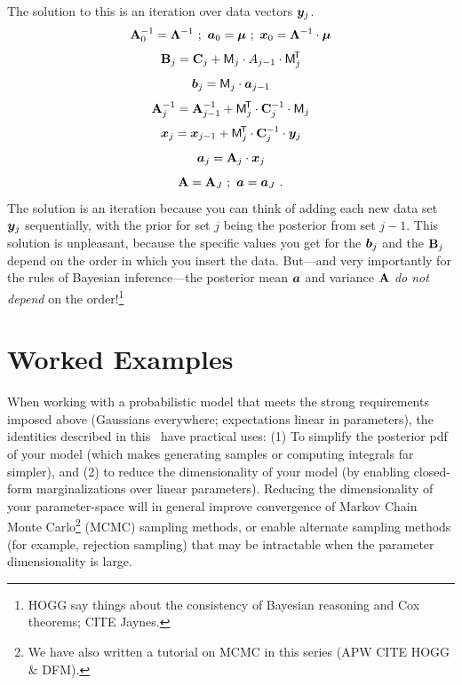 The solution to this is an iteration over data vectors $\boldsymbol{y}_j$.
\begin{equation}
  \mathbf{A}_0^{-1} = \mathbf{\Lambda}^{-1} ~;~ \boldsymbol{a}_0 = \boldsymbol{\mu} ~;~ \boldsymbol{x}_0 = \mathbf{\Lambda}^{-1}\cdot\boldsymbol{\mu}
\end{equation}
\begin{equation}
  \mathbf{B}_j = \mathbf{C}_j + \mathsf{M}_j \cdot A_{j-1} \cdot \mathsf{M}_j^{\!\mathsf{T}\!}
\end{equation}
\begin{equation}
  \boldsymbol{b}_j = \mathsf{M}_j \cdot \boldsymbol{a}_{j-1}
\end{equation}
\begin{equation}
  \mathbf{A}_j^{-1} = \mathbf{A}_{j-1}^{-1} + \mathsf{M}_j^{\!\mathsf{T}\!} \cdot \mathbf{C}_j^{-1} \cdot \mathsf{M}_j
\end{equation}
\begin{equation}
  \boldsymbol{x}_j = \boldsymbol{x}_{j-1} + \mathsf{M}_j^{\!\mathsf{T}\!} \cdot \mathbf{C}_j^{-1} \cdot \boldsymbol{y}_j
\end{equation}
\begin{equation}
  \boldsymbol{a}_j = \mathbf{A}_j \cdot \boldsymbol{x}_j
\end{equation}
\begin{equation}
  \mathbf{A} = \mathbf{A}_J ~;~ \boldsymbol{a} = \boldsymbol{a}_J
  ~.
\end{equation}
The solution is an iteration because you can think of adding each new data
set $\boldsymbol{y}_j$ sequentially, with the prior for set $j$ being the posterior from
set $j-1$.
This solution is unpleasant, because the specific values you get for the
$\boldsymbol{b}_j$ and the $\mathbf{B}_j$ depend on the order in which you insert the data.
But---and very importantly for the rules of Bayesian inference---the posterior
mean $\boldsymbol{a}$ and variance $\mathbf{A}$ \emph{do not depend} on the order!\footnote{HOGG say
  things about the consistency of Bayesian reasoning and Cox theorems; CITE Jaynes.}


\section{Worked Examples}\label{sec:examples}

When working with a probabilistic model that meets the strong requirements
imposed above (Gaussians everywhere; expectations linear in parameters),
the identities described in this
\documentname\ have practical uses: (1) To simplify the posterior pdf of your
model (which makes generating samples or computing integrals far simpler), and
(2) to reduce the dimensionality of your model (by enabling closed-form
marginalizations over linear parameters).
Reducing the dimensionality of your parameter-space will in general improve
convergence of Markov Chain Monte Carlo\footnote{We have also written a tutorial
  on MCMC in this series (APW CITE HOGG \& DFM).} (MCMC)
sampling methods, or enable
alternate sampling methods (for example, rejection sampling) that may be intractable
when the parameter dimensionality is large.

